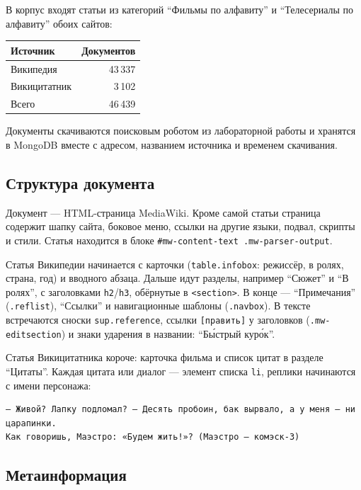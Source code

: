 \documentclass[12pt,a4paper,oneside,fleqn]{article}
\begin{document}
В корпус входят статьи из категорий \enquote{Фильмы по алфавиту} и \enquote{Телесериалы по алфавиту} обоих сайтов:

\begin{center}
\begin{tabular}{|l|r|}
\hline
\textbf{Источник} & \textbf{Документов} \\
\hline
Википедия & 43\,337 \\
Викицитатник & 3\,102 \\
\hline
Всего & 46\,439 \\
\hline
\end{tabular}
\end{center}

Документы скачиваются поисковым роботом из лабораторной работы  и хранятся в MongoDB вместе с адресом, названием источника и временем скачивания.

\subsection{Структура документа}

Документ --- HTML-страница MediaWiki. Кроме самой статьи страница содержит шапку сайта, боковое меню, ссылки на другие языки, подвал, скрипты и стили. Статья находится в блоке \texttt{\#mw-content-text .mw-parser-output}.

Статья Википедии начинается с карточки (\texttt{table.infobox}: режиссёр, в ролях, страна, год) и вводного абзаца. Дальше идут разделы, например \enquote{Сюжет} и \enquote{В ролях}, с заголовками \texttt{h2}/\texttt{h3}, обёрнутые в \texttt{<section>}. В конце --- \enquote{Примечания} (\texttt{.reflist}), \enquote{Ссылки} и навигационные шаблоны (\texttt{.navbox}). В тексте встречаются сноски \texttt{sup.reference}, ссылки \texttt{[править]} у заголовков (\texttt{.mw-editsection}) и знаки ударения в названии: \enquote{Б\'{ы}стрый кур\'{о}к}.

Статья Викицитатника короче: карточка фильма и список цитат в разделе \enquote{Цитаты}. Каждая цитата или диалог --- элемент списка \texttt{li}, реплики начинаются с имени персонажа:

\begin{lstlisting}[style=plaintext]
— Живой? Лапку подломал? — Десять пробоин, бак вырвало, а у меня — ни царапинки.
Как говоришь, Маэстро: «Будем жить!»? (Маэстро — комэск-3)
\end{lstlisting}

\subsection{Метаинформация}
\end{document}
